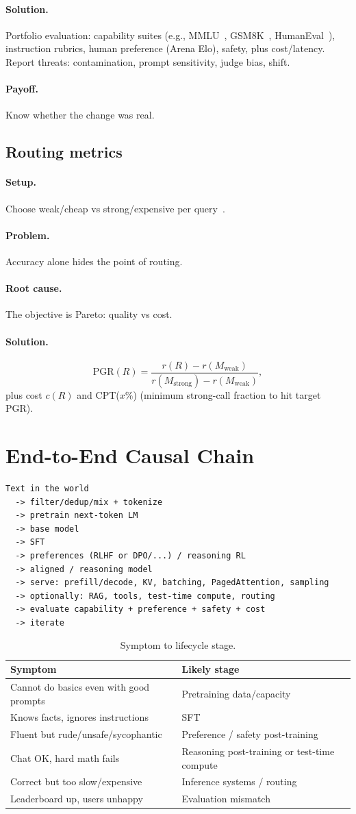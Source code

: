 \documentclass[11pt,a4paper]{article}
\newcommand{\layer}[1]{\paragraph{#1.}}
\newcommand{\setup}{\layer{Setup}}
\newcommand{\problem}{\layer{Problem}}
\newcommand{\rootcause}{\layer{Root cause}}
\newcommand{\solution}{\layer{Solution}}
\newcommand{\payoff}{\layer{Payoff}}
\begin{document}
\solution
Portfolio evaluation: capability suites (e.g., MMLU~\cite{hendrycks2021mmlu}, GSM8K~\cite{cobbe2021gsm8k}, HumanEval~\cite{chen2021humaneval}), instruction rubrics, human preference (Arena Elo), safety, plus cost/latency.
Report threats: contamination, prompt sensitivity, judge bias, shift.

\payoff
Know whether the change was real.

\subsection{Routing metrics}
\label{sec:routing-eval}

\setup
Choose weak/cheap vs strong/expensive per query~\cite{ong2025routellm,ding2024hybrid}.

\problem
Accuracy alone hides the point of routing.

\rootcause
The objective is Pareto: quality vs cost.

\solution
\begin{equation}
\mathrm{PGR}(R)=\frac{r(R)-r(M_{\mathrm{weak}})}{r(M_{\mathrm{strong}})-r(M_{\mathrm{weak}})},
\end{equation}
plus cost \(c(R)\) and CPT(\(x\%\)) (minimum strong-call fraction to hit target PGR).

\section{End-to-End Causal Chain}
\label{sec:chain}

\begin{lstlisting}[basicstyle=\ttfamily\small,frame=single]
Text in the world
  -> filter/dedup/mix + tokenize
  -> pretrain next-token LM
  -> base model
  -> SFT
  -> preferences (RLHF or DPO/...) / reasoning RL
  -> aligned / reasoning model
  -> serve: prefill/decode, KV, batching, PagedAttention, sampling
  -> optionally: RAG, tools, test-time compute, routing
  -> evaluate capability + preference + safety + cost
  -> iterate
\end{lstlisting}

\begin{table}[ht]
\centering
\small
\begin{tabularx}{\textwidth}{@{}lY@{}}
\toprule
\textbf{Symptom} & \textbf{Likely stage} \\
\midrule
Cannot do basics even with good prompts & Pretraining data/capacity \\
Knows facts, ignores instructions & SFT \\
Fluent but rude/unsafe/sycophantic & Preference / safety post-training \\
Chat OK, hard math fails & Reasoning post-training or test-time compute \\
Correct but too slow/expensive & Inference systems / routing \\
Leaderboard up, users unhappy & Evaluation mismatch \\
\bottomrule
\end{tabularx}
\caption{Symptom to lifecycle stage.}
\label{tab:symptoms}
\end{table}
\end{document}
